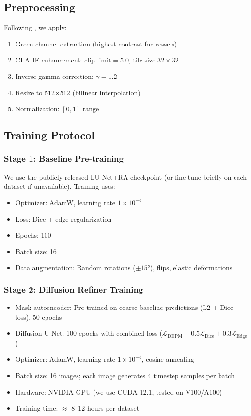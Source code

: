 \documentclass[11pt]{article}
\begin{document}
\subsection{Preprocessing}

Following \cite{LU2023}, we apply:
\begin{enumerate}
    \item Green channel extraction (highest contrast for vessels)
    \item CLAHE enhancement: $\text{clip\_limit}=5.0$, tile size $32 \times 32$
    \item Inverse gamma correction: $\gamma=1.2$
    \item Resize to 512$\times$512 (bilinear interpolation)
    \item Normalization: $[0,1]$ range
\end{enumerate}

\subsection{Training Protocol}

\subsubsection{Stage 1: Baseline Pre-training}
We use the publicly released LU-Net+RA checkpoint (or fine-tune briefly on each dataset if unavailable). Training uses:
\begin{itemize}
    \item Optimizer: AdamW, learning rate $1 \times 10^{-4}$
    \item Loss: Dice + edge regularization
    \item Epochs: 100
    \item Batch size: 16
    \item Data augmentation: Random rotations ($\pm 15°$), flips, elastic deformations
\end{itemize}

\subsubsection{Stage 2: Diffusion Refiner Training}
\begin{itemize}
    \item Mask autoencoder: Pre-trained on coarse baseline predictions (L2 + Dice loss), 50 epochs
    \item Diffusion U-Net: 100 epochs with combined loss ($\mathcal{L}_{\text{DDPM}} + 0.5 \mathcal{L}_{\text{Dice}} + 0.3 \mathcal{L}_{\text{Edge}}$)
    \item Optimizer: AdamW, learning rate $1 \times 10^{-4}$, cosine annealing
    \item Batch size: 16 images; each image generates 4 timestep samples per batch
    \item Hardware: NVIDIA GPU (we use CUDA 12.1, tested on V100/A100)
    \item Training time: $\approx$ 8--12 hours per dataset
\end{itemize}
\end{document}
